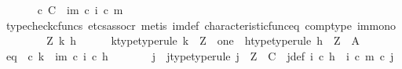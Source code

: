 \begin{isabellebody}
\ \ \ \ \isamarkupfalse%
\ {\isachardoublequoteopen}{\isasymt}\ {\isasymcirc}\isactrlsub c\ {\isasymbeta}\isactrlbsub C\isactrlesub \ {\isacharequal}{\kern0pt}\ {\isacharparenleft}{\kern0pt}{\isasymchi}im\ {\isasymcirc}\isactrlsub c\ i{\isacharparenright}{\kern0pt}\ {\isasymcirc}\isactrlsub c\ m{\isachardoublequoteclose}\isanewline
\ \ \ \ \ \ \isamarkupfalse%
\ {\isacharparenleft}{\kern0pt}typecheck{\isacharunderscore}{\kern0pt}cfuncs{\isacharcomma}{\kern0pt}\ etcs{\isacharunderscore}{\kern0pt}assocr{\isacharcomma}{\kern0pt}\ metis\ {\isasymchi}im{\isacharunderscore}{\kern0pt}def\ characteristic{\isacharunderscore}{\kern0pt}func{\isacharunderscore}{\kern0pt}eq\ comp{\isacharunderscore}{\kern0pt}type\ im{\isacharunderscore}{\kern0pt}mono{\isacharparenright}{\kern0pt}\isanewline
\ \ \isamarkupfalse%
\isanewline
\ \ \ \ \isamarkupfalse%
\ Z\ k\ h\isanewline
\ \ \ \ \isamarkupfalse%
\ k{\isacharunderscore}{\kern0pt}type{\isacharbrackleft}{\kern0pt}type{\isacharunderscore}{\kern0pt}rule{\isacharbrackright}{\kern0pt}{\isacharcolon}{\kern0pt}\ {\isachardoublequoteopen}k\ {\isacharcolon}{\kern0pt}\ Z\ {\isasymrightarrow}\ one{\isachardoublequoteclose}\ \ h{\isacharunderscore}{\kern0pt}type{\isacharbrackleft}{\kern0pt}type{\isacharunderscore}{\kern0pt}rule{\isacharbrackright}{\kern0pt}{\isacharcolon}{\kern0pt}\ {\isachardoublequoteopen}h\ {\isacharcolon}{\kern0pt}\ Z\ {\isasymrightarrow}\ A{\isachardoublequoteclose}\isanewline
\ \ \ \ \isamarkupfalse%
\ eq{\isacharcolon}{\kern0pt}\ {\isachardoublequoteopen}{\isasymt}\ {\isasymcirc}\isactrlsub c\ k\ {\isacharequal}{\kern0pt}\ {\isacharparenleft}{\kern0pt}{\isasymchi}im\ {\isasymcirc}\isactrlsub c\ i{\isacharparenright}{\kern0pt}\ {\isasymcirc}\isactrlsub c\ h{\isachardoublequoteclose}\isanewline
\ \ \ \ \isamarkupfalse%
\ \isamarkupfalse%
\ j\ \ j{\isacharunderscore}{\kern0pt}type{\isacharbrackleft}{\kern0pt}type{\isacharunderscore}{\kern0pt}rule{\isacharbrackright}{\kern0pt}{\isacharcolon}{\kern0pt}\ {\isachardoublequoteopen}j\ {\isacharcolon}{\kern0pt}\ Z\ {\isasymrightarrow}\ C{\isachardoublequoteclose}\ \ j{\isacharunderscore}{\kern0pt}def{\isacharcolon}{\kern0pt}\ {\isachardoublequoteopen}i\ {\isasymcirc}\isactrlsub c\ h\ {\isacharequal}{\kern0pt}\ {\isacharparenleft}{\kern0pt}i\ {\isasymcirc}\isactrlsub c\ m{\isacharparenright}{\kern0pt}\ {\isasymcirc}\isactrlsub c\ j{\isachardoublequoteclose}\isanewline
\ \ \ \ \ \ \isamarkupfalse%

\end{isabellebody}
